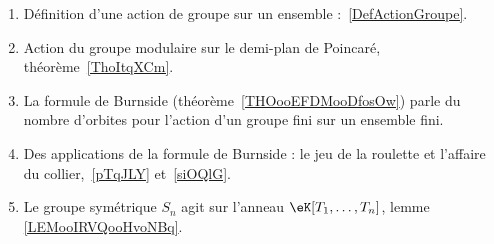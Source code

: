 
        \label{THEMEooKZHBooRCULcr}
\begin{enumerate}
	\item Définition d'une action de groupe sur un ensemble :~\ref{DefActionGroupe}.
	\item Action du groupe modulaire sur le demi-plan de Poincaré, théorème~\ref{ThoItqXCm}.
	\item
	      La formule de Burnside (théorème~\ref{THOooEFDMooDfosOw}) parle du nombre d'orbites pour l'action d'un groupe fini sur un ensemble fini.
	\item Des applications de la formule de Burnside : le jeu de la roulette et l'affaire du collier,~\ref{pTqJLY} et~\ref{siOQlG}.
	\item

	      Le groupe symétrique  \( S_n\) agit sur l'anneau  \( \eK[T_1,\ldots, T_n]\), lemme \ref{LEMooIRVQooHvoNBq}.

\end{enumerate}

